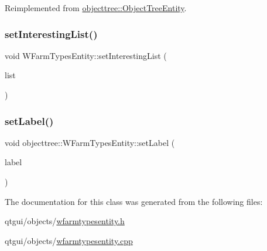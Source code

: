 Reimplemented from \mbox{\hyperlink{classobjecttree_1_1_object_tree_entity_ab6742194e637093cb1571998bee88ff5}{objecttree\+::\+Object\+Tree\+Entity}}.

\mbox{\label{classobjecttree_1_1_w_farm_types_entity_ab32b3cd66c1749cbf17ee9bcce8e76ff}} 
\subsubsection{\texorpdfstring{setInterestingList()}{setInterestingList()}}
{\footnotesize\ttfamily void W\+Farm\+Types\+Entity\+::set\+Interesting\+List (\begin{DoxyParamCaption}\item[{std\+::shared\+\_\+ptr$<$ \mbox{\hyperlink{class_interesting_list_with_special_values}{Interesting\+List\+With\+Special\+Values}}$<$ int $>$$>$}]{list }\end{DoxyParamCaption})}

\mbox{\label{classobjecttree_1_1_w_farm_types_entity_ae176bbd77fefb1cc6bfe53346523093f}} 
\subsubsection{\texorpdfstring{setLabel()}{setLabel()}}
{\footnotesize\ttfamily void objecttree\+::\+W\+Farm\+Types\+Entity\+::set\+Label (\begin{DoxyParamCaption}\item[{Q\+String}]{label }\end{DoxyParamCaption})\hspace{0.3cm}{\ttfamily [inline]}}



The documentation for this class was generated from the following files\+:\begin{DoxyCompactItemize}
\item 
qtgui/objects/\mbox{\hyperlink{wfarmtypesentity_8h}{wfarmtypesentity.\+h}}\item 
qtgui/objects/\mbox{\hyperlink{wfarmtypesentity_8cpp}{wfarmtypesentity.\+cpp}}\end{DoxyCompactItemize}
